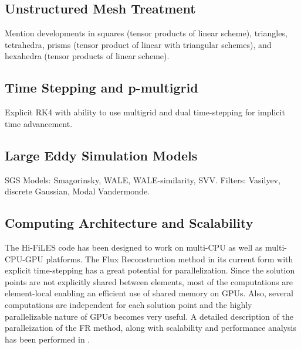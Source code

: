 

\subsection{Unstructured Mesh Treatment}
Mention developments in squares (tensor products of linear scheme), triangles\cite{castonguay2012new,williams2013tri}, tetrahedra\cite{williams2013tet}, prisms (tensor product of linear with triangular schemes), and hexahedra (tensor products of linear scheme).

\subsection{Time Stepping and p-multigrid}
Explicit RK4 with ability to use multigrid\cite{fidkowski2005p} and dual time-stepping\cite{Jameson1991DualTime} for implicit time advancement.


\subsection{Large Eddy Simulation Models}
SGS Models: Smagorinsky\cite{smagorinsky1963}, WALE\cite{nicoud1999}, WALE-similarity\cite{lodato2009}, SVV\cite{karamanos2000}.
Filters: Vasilyev\cite{vasilyev1998,vasilyev2001}, discrete Gaussian\cite{lodato2012b}, Modal Vandermonde\cite{blackburn2003}.

\subsection{Computing Architecture and Scalability}

The Hi-FiLES code has been designed to work on multi-CPU as well as multi-CPU-GPU platforms. The Flux Reconstruction method in its current form with explicit time-stepping has a great potential for parallelization. Since the solution points are not explicitly shared between elements, most of the computations are element-local enabling an efficient use of shared memory on GPUs. Also, several computations are independent for each solution point and the highly parallelizable nature of GPUs becomes very useful. A detailed description of the paralleization of the FR method, along with scalability and performance analysis has been performed in \cite{castonguay2011}.

